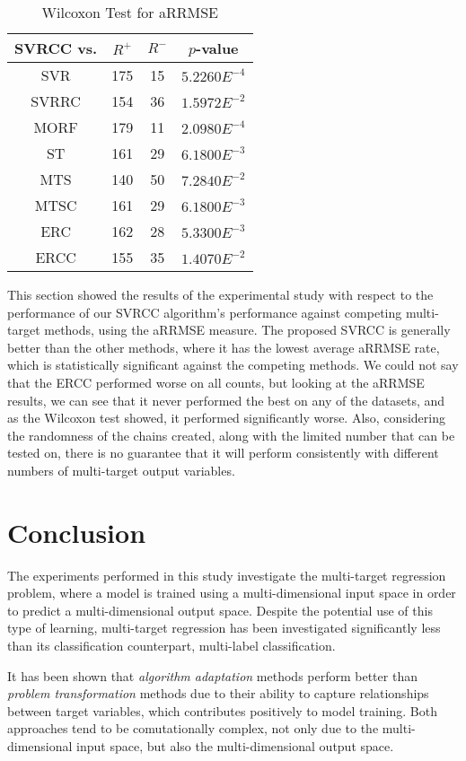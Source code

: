 \documentclass[preprint,12pt]{elsarticle}
\begin{document}
\begin{table}
\renewcommand{\arraystretch}{1.2}
\centering
\caption{Wilcoxon Test for aRRMSE}
\label{tab:Wilcoxon}
\begin{tabular}{cccc}
SVRCC vs. & $R^{+}$ & $R^{-}$ & $p$-value\\ 
\hline 
SVR & 175 & 15 & $5.2260E^{-4}$\\  
SVRRC & 154 & 36 & $1.5972E^{-2}$\\  
MORF & 179 & 11 & $2.0980E^{-4}$\\  
ST & 161 & 29 & $6.1800E^{-3}$\\  
MTS & 140 & 50 & $7.2840E^{-2}$\\  
MTSC & 161 & 29 & $6.1800E^{-3}$\\
ERC & 162 & 28 & $5.3300E^{-3}$\\
ERCC & 155 & 35 & $1.4070E^{-2}$\\ 
\hline 
\end{tabular}
\end{table}

This section showed the results of the experimental study with respect to the performance of our SVRCC algorithm's performance against competing multi-target methods, using the aRRMSE measure. The proposed SVRCC is generally better than the other methods, where it has the lowest average aRRMSE rate, which is statistically significant against the competing methods. We could not say that the ERCC performed worse on all counts, but looking at the aRRMSE results, we can see that it never performed the best on any of the datasets, and as the Wilcoxon test showed, it performed significantly worse. Also, considering the randomness of the chains created, along with the limited number that can be tested on, there is no guarantee that it will perform consistently with different numbers of multi-target output variables.

\section{Conclusion}\label{sec:conclusions}
The experiments performed in this study investigate the multi-target regression problem, where a model is trained using a multi-dimensional input space in order to predict a multi-dimensional output space. Despite the potential use of this type of learning, multi-target regression has been investigated significantly less than its classification counterpart, multi-label classification. 

It has been shown that \textit{algorithm adaptation} methods perform better than \textit{problem transformation} methods due to their ability to capture relationships between target variables, which contributes positively to model training. Both approaches tend to be comutationally complex, not only due to the multi-dimensional input space, but also the multi-dimensional output space.
\end{document}

